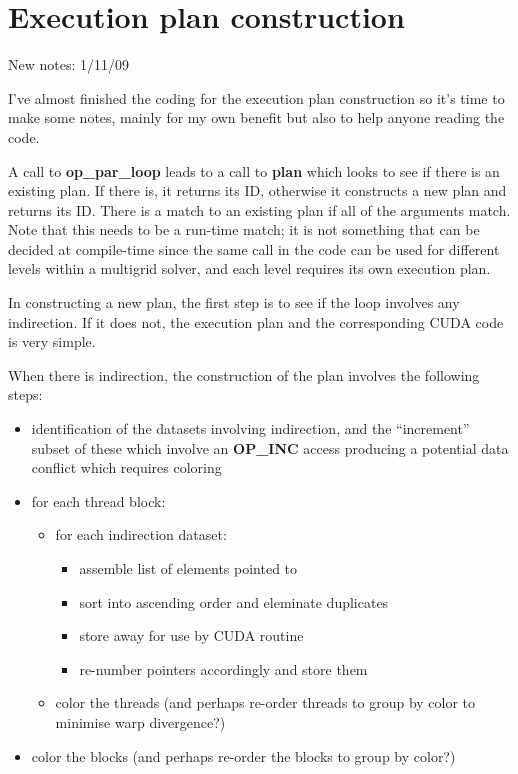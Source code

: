 \documentclass[12pt]{article}
\begin{document}
\section{Execution plan construction}

New notes: 1/11/09

I've almost finished the coding for the execution plan construction so 
it's time to make some notes, mainly for my own benefit but also to help
anyone reading the code.

A call to {\bf op\_par\_loop} leads to a call to {\bf plan} which 
looks to see if there is an existing plan.  If there is, it returns 
its ID, otherwise it constructs a new plan and returns its ID.
There is a match to an existing plan if all of the arguments match.  
Note that this needs to be a run-time match; it is not something that 
can be decided at compile-time since the same call in the code can be
used for different levels within a multigrid solver, and each level 
requires its own execution plan.

In constructing a new plan, the first step is to see if the loop
involves any indirection.  If it does not, the execution plan and the
corresponding CUDA code is very simple.

When there is indirection, the construction of the plan involves the 
following steps:
\begin{itemize}
\item
identification of the datasets involving indirection, and the 
``increment'' subset of these which involve an {\bf OP\_INC} access 
producing a potential data conflict which requires coloring

\item
for each thread block:
  \begin{itemize}
  \item for each indirection dataset:
    \begin{itemize}
    \item assemble list of elements pointed to
    \item sort into ascending order and eleminate duplicates
    \item store away for use by CUDA routine
    \item re-number pointers accordingly and store them
    \end{itemize}
  \item color the threads (and perhaps re-order threads
        to group by color to minimise warp divergence?)
  \end{itemize}

\item
color the blocks (and perhaps re-order the blocks to group 
by color?) 
\end{itemize}
\end{document}
